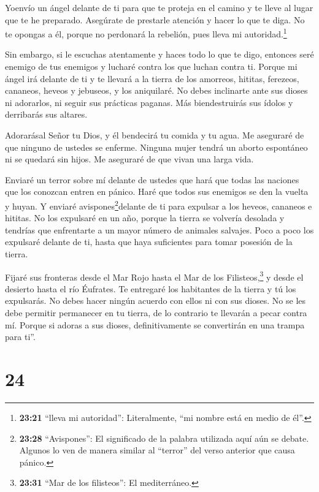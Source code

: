  Yoenvío un ángel delante de ti para que te proteja en el
camino y te lleve al lugar que te he preparado.  Asegúrate
de prestarle atención y hacer lo que te diga. No te opongas a él, porque
no perdonará la rebelión, pues lleva mi autoridad.\footnote{\textbf{23:21}
  ``lleva mi autoridad'': Literalmente, ``mi nombre está en medio de
  él''.}

 Sin embargo, si le escuchas atentamente y haces todo lo
que te digo, entonces seré enemigo de tus enemigos y lucharé contra los
que luchan contra ti.  Porque mi ángel irá delante de ti y
te llevará a la tierra de los amorreos, hititas, ferezeos, cananeos,
heveos y jebuseos, y los aniquilaré.  No debes inclinarte
ante sus dioses ni adorarlos, ni seguir sus prácticas paganas. Más
biendestruirás sus ídolos y derribarás sus altares.

 Adorarásal Señor tu Dios, y él bendecirá tu comida y tu
agua. Me aseguraré de que ninguno de ustedes se enferme. 
Ninguna mujer tendrá un aborto espontáneo ni se quedará sin hijos. Me
aseguraré de que vivan una larga vida.

 Enviaré un terror sobre mí delante de ustedes que hará que
todas las naciones que los conozcan entren en pánico. Haré que todos sus
enemigos se den la vuelta y huyan.  Y enviaré
avispones\footnote{\textbf{23:28} ``Avispones'': El significado de la
  palabra utilizada aquí aún se debate. Algunos lo ven de manera similar
  al ``terror'' del verso anterior que causa pánico.}delante de ti para
expulsar a los heveos, cananeos e hititas.  No los
expulsaré en un año, porque la tierra se volvería desolada y tendrías
que enfrentarte a un mayor número de animales salvajes. 
Poco a poco los expulsaré delante de ti, hasta que haya suficientes para
tomar posesión de la tierra.

 Fijaré sus fronteras desde el Mar Rojo hasta el Mar de los
Filisteos,\footnote{\textbf{23:31} ``Mar de los filisteos'': El
  mediterráneo.} y desde el desierto hasta el río Éufrates. Te entregaré
los habitantes de la tierra y tú los expulsarás.  No debes
hacer ningún acuerdo con ellos ni con sus dioses.  No se
les debe permitir permanecer en tu tierra, de lo contrario te llevarán a
pecar contra mí. Porque si adoras a sus dioses, definitivamente se
convertirán en una trampa para ti''.

\hypertarget{section-23}{%
\section{24}\label{section-23}}


